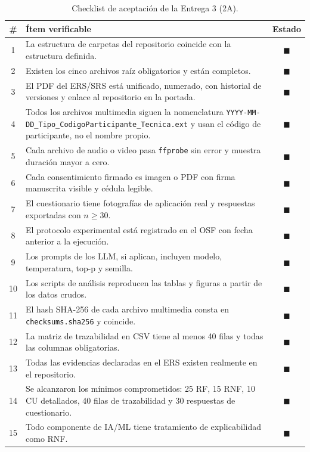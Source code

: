 \documentclass[journal,onecolumn]{IEEEtran}
\begin{document}
	\begin{table}[H]
		\centering
		\caption{Checklist de aceptación de la Entrega 3 (2A).}
		\label{tab:checklist}
		\small
		\begin{tabularx}{\textwidth}{@{}c X c@{}}
			\toprule
			\textbf{\#} & \textbf{Ítem verificable} & \textbf{Estado} \\
			\midrule
			1 & La estructura de carpetas del repositorio coincide con la estructura definida. & $\blacksquare$ \\
			2 & Existen los cinco archivos raíz obligatorios y están completos. & $\blacksquare$ \\
			3 & El PDF del ERS/SRS está unificado, numerado, con historial de versiones y enlace al repositorio en la portada. & $\blacksquare$ \\
			4 & Todos los archivos multimedia siguen la nomenclatura \texttt{YYYY-MM-DD\_Tipo\_CodigoParticipante\_Tecnica.ext} y usan el código de participante, no el nombre propio. & $\blacksquare$ \\
			5 & Cada archivo de audio o video pasa \texttt{ffprobe} sin error y muestra duración mayor a cero. & $\blacksquare$ \\
			6 & Cada consentimiento firmado es imagen o PDF con firma manuscrita visible y cédula legible. & $\blacksquare$ \\
			7 & El cuestionario tiene fotografías de aplicación real y respuestas exportadas con $n \geq 30$. & $\blacksquare$ \\
			8 & El protocolo experimental está registrado en el OSF con fecha anterior a la ejecución. & $\blacksquare$ \\
			9 & Los prompts de los LLM, si aplican, incluyen modelo, temperatura, top-p y semilla. & $\blacksquare$ \\
			10 & Los scripts de análisis reproducen las tablas y figuras a partir de los datos crudos. & $\blacksquare$ \\
			11 & El hash SHA-256 de cada archivo multimedia consta en \texttt{checksums.sha256} y coincide. & $\blacksquare$\\
			12 & La matriz de trazabilidad en CSV tiene al menos 40 filas y todas las columnas obligatorias. &$\blacksquare$ \\
			13 & Todas las evidencias declaradas en el ERS existen realmente en el repositorio. & $\blacksquare$ \\
			14 & Se alcanzaron los mínimos comprometidos: 25 RF, 15 RNF, 10 CU detallados, 40 filas de trazabilidad y 30 respuestas de cuestionario. & $\blacksquare$ \\
			15 & Todo componente de IA/ML tiene tratamiento de explicabilidad como RNF. & $\blacksquare$ \\
			\bottomrule
		\end{tabularx}
	\end{table}
	
	
\end{document}
